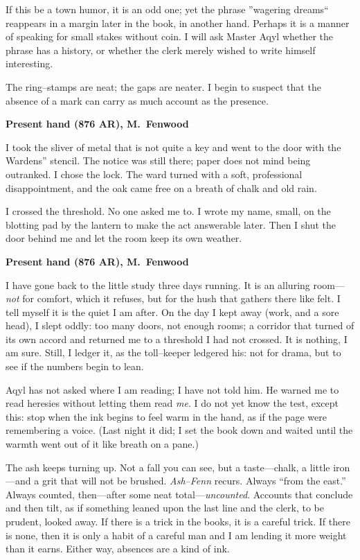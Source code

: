 \documentclass[11pt]{article}
\numberwithin{equation}{section} %
\theoremstyle{plain} %
\theoremstyle{definition} %
\theoremstyle{remark} %
\begin{document}
If this be a town humor, it is an odd one; yet the phrase ''wagering dreams`` reappears in a margin later in the book, in another hand. Perhaps it is a manner of speaking for small stakes without coin. I will ask Master Aqyl whether the phrase has a history, or whether the clerk merely wished to write himself interesting.

The ring--stamps are neat; the gaps are neater. I begin to suspect that the absence of a mark can carry as much account as the presence.

\medskip

\noindent\textbf{Present hand (876 AR), M.\ Fenwood}

I took the sliver of metal that is not quite a key and went to the door with the Wardens'' stencil. The notice was still there; paper does not mind being outranked. I chose the lock. The ward turned with a soft, professional disappointment, and the oak came free on a breath of chalk and old rain.

I crossed the threshold. No one asked me to. I wrote my name, small, on the blotting pad by the lantern to make the act answerable later. Then I shut the door behind me and let the room keep its own weather.

\medskip
\noindent\textbf{Present hand (876 AR), M.\ Fenwood}

I have gone back to the little study three days running. It is an alluring room---\emph{not} for comfort, which it refuses, but for the hush that gathers there like felt. I tell myself it is the quiet I am after. On the day I kept away (work, and a sore head), I slept oddly: too many doors, not enough rooms; a corridor that turned of its own accord and returned me to a threshold I had not crossed. It is nothing, I am sure. Still, I ledger it, as the toll--keeper ledgered his: not for drama, but to see if the numbers begin to lean.

Aqyl has not asked where I am reading; I have not told him. He warned me to read heresies without letting them read \emph{me}. I do not yet know the test, except this: stop when the ink begins to feel warm in the hand, as if the page were remembering a voice. (Last night it did; I set the book down and waited until the warmth went out of it like breath on a pane.)

The ash keeps turning up. Not a fall you can see, but a taste---chalk, a little iron---and a grit that will not be brushed. \textit{Ash--Fenn} recurs. Always ``from the east.'' Always counted, then---after some neat total---\emph{uncounted}. Accounts that conclude and then tilt, as if something leaned upon the last line and the clerk, to be prudent, looked away. If there is a trick in the books, it is a careful trick. If there is none, then it is only a habit of a careful man and I am lending it more weight than it earns. Either way, absences are a kind of ink.
\end{document}
